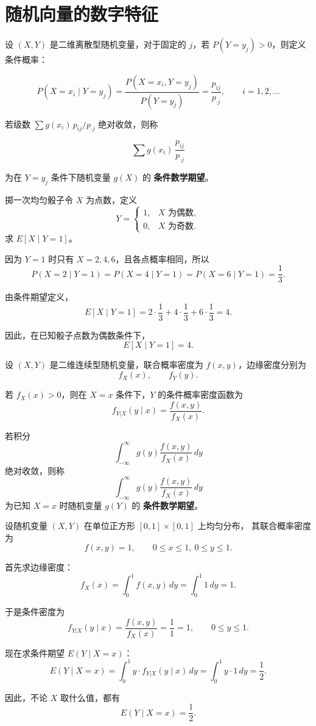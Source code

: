 \section{随机向量的数字特征}
\begin{definition}[条件期望]
设 $(X, Y)$ 是二维离散型随机变量，对于固定的 $j$，若 $P(Y = y_j) > 0$，则定义条件概率：

\[
P(X = x_i \mid Y = y_j)
    = \frac{P(X = x_i, Y = y_j)}{P(Y = y_j)}
    = \frac{p_{ij}}{p_{\cdot j}}, \qquad i = 1, 2, \ldots
\]

若级数 $\sum g(x_i) \, p_{ij} / p_{\cdot j}$ 绝对收敛，则称

\[
\sum g(x_i)\, \frac{p_{ij}}{p_{\cdot j}}
\]

为在 $Y = y_j$ 条件下随机变量 $g(X)$ 的 \textbf{条件数学期望}。
\end{definition}
\begin{example}[条件期望的简单例子]
掷一次均匀骰子令 $X$ 为点数，定义
\[
Y =
\begin{cases}
1, & X \text{ 为偶数},\\
0, & X \text{ 为奇数}.
\end{cases}
\]
求 $E[X \mid Y = 1]$。

因为 $Y=1$ 时只有 $X = 2,4,6$，且各点概率相同，所以
\[
P(X = 2 \mid Y = 1) = P(X = 4 \mid Y = 1) = P(X = 6 \mid Y = 1) = \frac{1}{3}.
\]

由条件期望定义，
\[
E[X \mid Y = 1]
= 2 \cdot \frac13 + 4 \cdot \frac13 + 6 \cdot \frac13
= 4.
\]

因此，在已知骰子点数为偶数条件下，
\[
E[X \mid Y = 1] = 4.
\]
\end{example}
\begin{definition}
设 $(X, Y)$ 是二维连续型随机变量，联合概率密度为 $f(x,y)$，边缘密度分别为
\[
f_X(x), \qquad f_Y(y).
\]

若 $f_X(x) > 0$，则在 $X = x$ 条件下，$Y$ 的条件概率密度函数为
\[
f_{Y|X}(y \mid x) = \frac{f(x,y)}{f_X(x)}.
\]

若积分
\[
\int_{-\infty}^{\infty} g(y)\frac{f(x,y)}{f_X(x)} \, dy
\]
绝对收敛，则称
\[
\int_{-\infty}^{\infty} g(y)\frac{f(x,y)}{f_X(x)} \, dy
\]
为已知 $X = x$ 时随机变量 $g(Y)$ 的 \textbf{条件数学期望}。
\end{definition}
\begin{example}[连续型条件期望的简单例子]
设随机变量 $(X,Y)$ 在单位正方形 $[0,1]\times[0,1]$ 上均匀分布，
其联合概率密度为
\[
f(x,y) = 1, \qquad 0 \le x \le 1,~ 0 \le y \le 1.
\]

首先求边缘密度：
\[
f_X(x) = \int_0^1 f(x,y)\, dy = \int_0^1 1\, dy = 1.
\]

于是条件密度为
\[
f_{Y|X}(y \mid x) = \frac{f(x,y)}{f_X(x)} = \frac{1}{1} = 1,
\qquad 0 \le y \le 1.
\]

现在求条件期望 $E(Y \mid X = x)$：
\[
E(Y \mid X = x)
= \int_0^1 y \cdot f_{Y|X}(y \mid x)\, dy
= \int_0^1 y \cdot 1\, dy
= \frac{1}{2}.
\]

因此，不论 $X$ 取什么值，都有
\[
E(Y \mid X = x) = \frac{1}{2}.
\]
\end{example}
